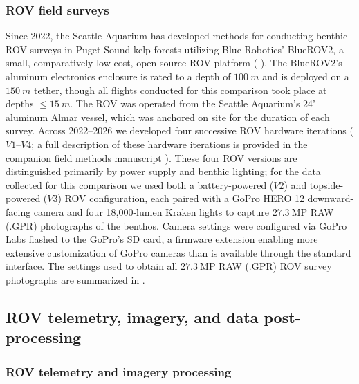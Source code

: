 \documentclass[11pt]{article}
\newcommand{\boxedref}[2]{%
	\begingroup
	\setlength{\fboxrule}{0.8pt}%
	\setlength{\fboxsep}{1.5pt}%
	\textcolor{linkcyan}{%
		\fbox{%
			\textcolor{black}{%
				\hyperref[#2]{#1~\ref*{#2}}%
			}%
		}%
	}%
	\endgroup
}
\newcommand{\figref}[1]{\boxedref{Fig.}{#1}}\newcommand{\tabref}[1]{\boxedref{Table}{#1}}
\begin{document}
\subsubsection{ROV field surveys}
\label{subsubsec:ROV_ops}

Since 2022, the Seattle Aquarium has developed methods for conducting benthic 
ROV surveys in Puget Sound kelp forests utilizing Blue Robotics' BlueROV2, a 
small, comparatively low-cost, open-source ROV platform (\figref{fig:ROV}).
The BlueROV2's aluminum electronics enclosure is rated to a depth of $100~m$
and is deployed on a $150~m$ tether, though all flights conducted
for this comparison took place at depths $\le 15~m$. 
The ROV was operated from the Seattle Aquarium's 24' aluminum Almar vessel, 
which was anchored on site for the duration of each survey.
Across 2022--2026 we developed four successive ROV hardware iterations 
($V1$--$V4$; a full description of these hardware iterations is provided in 
the companion field methods manuscript \citep{Randell:2026aa}). 
These four ROV versions are distinguished primarily by power supply and benthic 
lighting; 
for the data collected for this comparison we used both a battery-powered 
($V2$) and topside-powered ($V3$) ROV configuration, each paired with a GoPro 
HERO 12 downward-facing camera and four 18,000-lumen Kraken lights to capture 
$27.3~\mathrm{MP}$ RAW (.GPR) photographs of the benthos.
Camera settings were configured via GoPro Labs flashed to the GoPro's SD card, a firmware extension enabling more extensive customization of GoPro cameras than is available through the standard interface.
The settings used to obtain all \(27.3~\mathrm{MP}\) RAW (.GPR) ROV survey 
photographs are summarized in \figref{fig:camera_settings}.

\subsection{ROV telemetry, imagery, and data post-processing}
\label{subsec:post-processing}

\subsubsection{ROV telemetry and imagery processing}
\label{subsec:telemetry}
\end{document}
